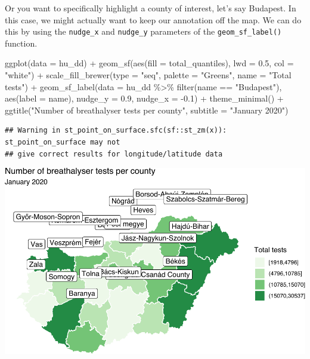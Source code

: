 \documentclass[
]{book}
\newenvironment{Shaded}{\begin{snugshade}}{\end{snugshade}}
\newcommand{\AttributeTok}[1]{\textcolor[rgb]{0.77,0.63,0.00}{#1}}
\newcommand{\FloatTok}[1]{\textcolor[rgb]{0.00,0.00,0.81}{#1}}
\newcommand{\FunctionTok}[1]{\textcolor[rgb]{0.00,0.00,0.00}{#1}}
\newcommand{\NormalTok}[1]{#1}
\newcommand{\SpecialCharTok}[1]{\textcolor[rgb]{0.00,0.00,0.00}{#1}}
\newcommand{\StringTok}[1]{\textcolor[rgb]{0.31,0.60,0.02}{#1}}
\begin{document}
Or you want to specifically highlight a county of interest, let's say Budapest. In this case, we might actually want to keep our annotation off the map. We can do this by using the \texttt{nudge\_x} and \texttt{nudge\_y} parameters of the \texttt{geom\_sf\_label()} function.

\begin{Shaded}
\begin{Highlighting}[]
\FunctionTok{ggplot}\NormalTok{(}\AttributeTok{data =}\NormalTok{ hu\_dd) }\SpecialCharTok{+} 
  \FunctionTok{geom\_sf}\NormalTok{(}\FunctionTok{aes}\NormalTok{(}\AttributeTok{fill =}\NormalTok{ total\_quantiles), }\AttributeTok{lwd =} \FloatTok{0.5}\NormalTok{, }\AttributeTok{col =} \StringTok{"white"}\NormalTok{) }\SpecialCharTok{+} 
  \FunctionTok{scale\_fill\_brewer}\NormalTok{(}\AttributeTok{type =} \StringTok{"seq"}\NormalTok{, }\AttributeTok{palette =} \StringTok{"Greens"}\NormalTok{, }\AttributeTok{name =} \StringTok{"Total tests"}\NormalTok{) }\SpecialCharTok{+} 
  \FunctionTok{geom\_sf\_label}\NormalTok{(}\AttributeTok{data =}\NormalTok{ hu\_dd }\SpecialCharTok{\%\textgreater{}\%} \FunctionTok{filter}\NormalTok{(name }\SpecialCharTok{==} \StringTok{"Budapest"}\NormalTok{), }\FunctionTok{aes}\NormalTok{(}\AttributeTok{label =}\NormalTok{ name), }\AttributeTok{nudge\_y =} \FloatTok{0.9}\NormalTok{, }\AttributeTok{nudge\_x =} \SpecialCharTok{{-}}\FloatTok{0.1}\NormalTok{) }\SpecialCharTok{+} 
  \FunctionTok{theme\_minimal}\NormalTok{() }\SpecialCharTok{+} 
  \FunctionTok{ggtitle}\NormalTok{(}\StringTok{"Number of breathalyser tests per county"}\NormalTok{, }\AttributeTok{subtitle =} \StringTok{"January 2020"}\NormalTok{)}
\end{Highlighting}
\end{Shaded}

\begin{verbatim}
## Warning in st_point_on_surface.sfc(sf::st_zm(x)): st_point_on_surface may not
## give correct results for longitude/latitude data
\end{verbatim}

\includegraphics{crime_mapping_files/figure-latex/addcountynamesBPonly-1.pdf}
\end{document}
